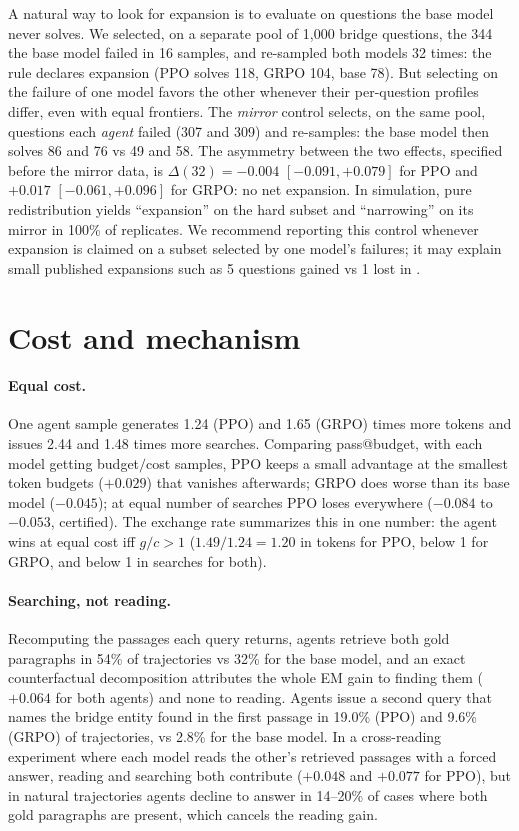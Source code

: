 \documentclass[11pt]{article}
\begin{document}
A natural way to look for expansion is to evaluate on questions the base model never solves. We selected, on a separate pool of 1{,}000 bridge questions, the 344 the base model failed in 16 samples, and re-sampled both models 32 times: the rule declares expansion (PPO solves 118, GRPO 104, base 78). But selecting on the failure of one model favors the other whenever their per-question profiles differ, even with equal frontiers. The \emph{mirror} control selects, on the same pool, questions each \emph{agent} failed (307 and 309) and re-samples: the base model then solves 86 and 76 vs 49 and 58. The asymmetry between the two effects, specified before the mirror data, is $\Delta(32) = -0.004$ $[-0.091, +0.079]$ for PPO and $+0.017$ $[-0.061, +0.096]$ for GRPO: no net expansion. In simulation, pure redistribution yields ``expansion'' on the hard subset and ``narrowing'' on its mirror in 100\% of replicates. We recommend reporting this control whenever expansion is claimed on a subset selected by one model's failures; it may explain small published expansions such as 5 questions gained vs 1 lost in \citet{zhai2026does}.

\section{Cost and mechanism}\label{sec:cost}

\paragraph{Equal cost.} One agent sample generates 1.24 (PPO) and 1.65 (GRPO) times more tokens and issues 2.44 and 1.48 times more searches. Comparing pass@budget, with each model getting budget$/$cost samples, PPO keeps a small advantage at the smallest token budgets ($+0.029$) that vanishes afterwards; GRPO does worse than its base model ($-0.045$); at equal number of searches PPO loses everywhere ($-0.084$ to $-0.053$, certified). The exchange rate summarizes this in one number: the agent wins at equal cost iff $g/c > 1$ ($1.49/1.24 = 1.20$ in tokens for PPO, below 1 for GRPO, and below 1 in searches for both).

\paragraph{Searching, not reading.} Recomputing the passages each query returns, agents retrieve both gold paragraphs in 54\% of trajectories vs 32\% for the base model, and an exact counterfactual decomposition attributes the whole EM gain to finding them ($+0.064$ for both agents) and none to reading. Agents issue a second query that names the bridge entity found in the first passage in 19.0\% (PPO) and 9.6\% (GRPO) of trajectories, vs 2.8\% for the base model. In a cross-reading experiment where each model reads the other's retrieved passages with a forced answer, reading and searching both contribute ($+0.048$ and $+0.077$ for PPO), but in natural trajectories agents decline to answer in 14--20\% of cases where both gold paragraphs are present, which cancels the reading gain.
\end{document}

